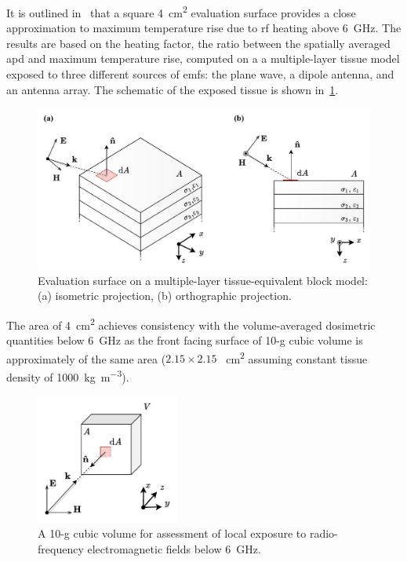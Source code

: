 It is outlined in~\cite{Hashimoto2017averaging} that a square \SI{4}{\cm\squared} evaluation surface provides a close approximation to maximum temperature rise due to \gls{rf} heating above \SI{6}{\GHz}.
The results are based on the heating factor, the ratio between the spatially averaged \gls{apd} and maximum temperature rise, computed on a a multiple-layer tissue model exposed to three different sources of \gls{emf}s: the plane wave, a dipole antenna, and an antenna array.
The schematic of the exposed tissue is shown in~\cref{fig:averaging_surface}.
\begin{figure}[t]
    \centering
    \includegraphics[width=\textwidth]{artwork/averaging_surface.pdf}
    \caption{Evaluation surface on a multiple-layer tissue-equivalent block model: (a) isometric projection, (b) orthographic projection.}
    \label{fig:averaging_surface}
\end{figure}
The area of \SI{4}{\cm\squared} achieves consistency with the volume-averaged dosimetric quantities below \SI{6}{\GHz} as the front facing surface of 10-g cubic volume is approximately of the same area ($2.15 \times 2.15$ \SI{}{\cm\squared} assuming constant tissue density of \SI{1000}{\kg\per\m\cubed}).
\begin{figure}[t]
    \centering
    \includegraphics[width=0.42\textwidth]{artwork/averaging_volume.pdf}
    \caption{A 10-g cubic volume for assessment of local exposure to radio-frequency electromagnetic fields below \SI{6}{\GHz}.}
    \label{fig:averaging_volume}
\end{figure}

